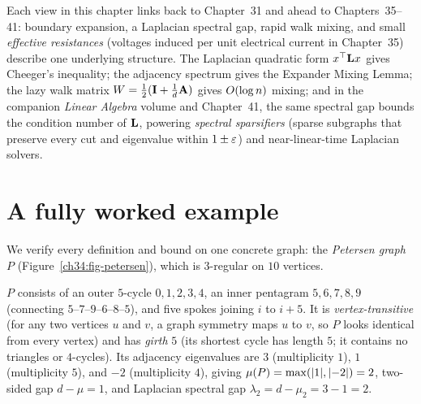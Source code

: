 \begin{connectionbox}
Each view in this chapter links back to Chapter~31 and ahead to Chapters~35--41: boundary expansion, a Laplacian spectral gap, rapid walk mixing, and small \emph{effective resistances} (voltages induced per unit electrical current in Chapter~35) describe one underlying structure. The Laplacian quadratic form $x^\top\mathbf{L} x$ gives Cheeger's inequality; the adjacency spectrum gives the Expander Mixing Lemma; the lazy walk matrix $W=\tfrac{1}{2}(\mathbf{I}+\tfrac{1}{d}\mathbf{A})$ gives $O(\log n)$ mixing; and in the companion \emph{Linear Algebra} volume and Chapter~41, the same spectral gap bounds the condition number of $\mathbf{L}$, powering \emph{spectral sparsifiers} (sparse subgraphs that preserve every cut and eigenvalue within $1\pm\varepsilon$) and near-linear-time Laplacian solvers.
\end{connectionbox}

\section{A fully worked example}
\label{ch34:worked}

We verify every definition and bound on one concrete graph: the \emph{Petersen graph} $P$ (Figure~\ref{ch34:fig-petersen}), which is $3$-regular on $10$ vertices.

\begin{intuitionbox}
$P$ consists of an outer $5$-cycle $0,1,2,3,4$, an inner pentagram $5,6,7,8,9$ (connecting $5$--$7$--$9$--$6$--$8$--$5$), and five spokes joining $i$ to $i+5$. It is \emph{vertex-transitive} (for any two vertices $u$ and $v$, a graph symmetry maps $u$ to $v$, so $P$ looks identical from every vertex) and has \emph{girth} $5$ (its shortest cycle has length $5$; it contains no triangles or $4$-cycles). Its adjacency eigenvalues are $3$ (multiplicity $1$), $1$ (multiplicity $5$), and $-2$ (multiplicity $4$), giving $\mu(P)=\max(\lvert1\rvert,\lvert-2\rvert)=2$, two-sided gap $d-\mu=1$, and Laplacian spectral gap $\lambda_2=d-\mu_2=3-1=2$.
\end{intuitionbox}

